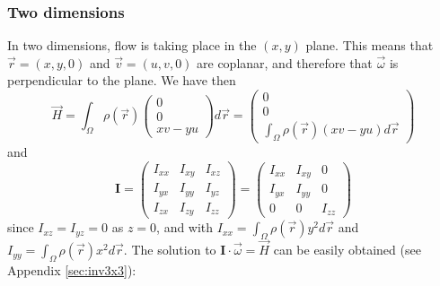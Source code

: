 \subsubsection{Two dimensions}

In two dimensions, flow is taking place in the $(x,y)$ plane. 
This means that $\vec r=(x,y,0)$ and $\vec v=(u,v,0)$ are coplanar, 
and therefore that $\vec \omega$ is perpendicular to the plane.
We have then
\begin{equation}
\vec H = \int_\Omega \rho(\vec r) \left( 
\begin{array}{c} 
0 \\ 0 \\ xv-yu 
\end{array} \right) d\vec r
= 
\left(\begin{array}{c} 
0 \\ 0 \\
\int_\Omega \rho(\vec r) (xv-yu) d\vec r
\end{array} \right)
\end{equation}
and 
\begin{equation}
\bm I
=
\left(
\begin{array}{ccc}
I_{xx} & I_{xy} & I_{xz} \\
I_{yx} & I_{yy} & I_{yz} \\
I_{zx} & I_{zy} & I_{zz} 
\end{array}
\right)
=
\left(
\begin{array}{ccc}
I_{xx} & I_{xy} & 0 \\
I_{yx} & I_{yy} & 0 \\
0      & 0      & I_{zz} 
\end{array}
\right)
\end{equation}
since $I_{xz}=I_{yz}=0$ as $z=0$, and with 
$I_{xx}=\int_\Omega \rho(\vec r) y^2 d\vec r$ and 
$I_{yy}=\int_\Omega \rho(\vec r) x^2 d\vec r$.
The solution to ${\bm I}\cdot \vec \omega = \vec H$ can be easily obtained 
(see Appendix \ref{sec:inv3x3}):
